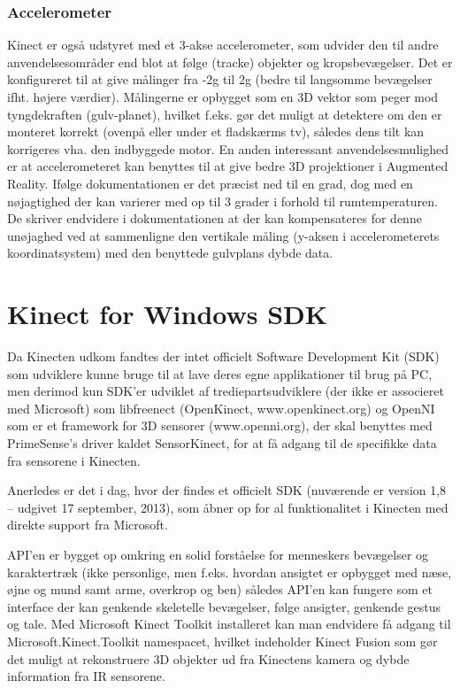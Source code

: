 \subsubsection{Accelerometer}
Kinect er også udstyret med et 3-akse accelerometer, som udvider den til andre anvendelsesområder end blot at følge (tracke) objekter og kropsbevægelser.
Det er konfigureret til at give målinger fra -2g til 2g (bedre til langsomme bevægelser ifht. højere værdier)\cite{kinectAccelerometer}.
Målingerne  er opbygget som en 3D vektor som peger mod tyngdekraften (gulv-planet), hvilket f.eks. gør det muligt at detektere om den er monteret korrekt (ovenpå eller under et fladskærms tv), således dens tilt kan korrigeres vha. den indbyggede motor.
En anden interessant anvendelsesmulighed er at accelerometeret kan benyttes til at give bedre 3D projektioner i Augmented Reality.
Ifølge dokumentationen\cite{kinectDocAccelerometer} er det præcist ned til en grad, dog med en nøjagtighed der kan varierer med op til 3 grader i forhold til rumtemperaturen.
De skriver endvidere i dokumentationen at der kan kompensateres for denne unøjaghed ved at sammenligne den vertikale måling (y-aksen i accelerometerets koordinatsystem) med den benyttede gulvplans dybde data.


\section{Kinect for Windows SDK}
Da Kinecten udkom fandtes der intet officielt Software Development Kit (SDK) som udviklere kunne bruge til at lave deres egne applikationer til brug på PC, men derimod kun SDK'er udviklet af trediepartsudviklere (der ikke er associeret med Microsoft) som libfreenect (OpenKinect, www.openkinect.org) og OpenNI som er et framework for 3D sensorer (www.openni.org), der skal benyttes med PrimeSense's driver kaldet SensorKinect, for at få adgang til de specifikke data fra sensorene i Kinecten.


Anerledes er det i dag, hvor der findes et officielt SDK (nuværende er version 1,8 – udgivet 17 september, 2013\cite{kinectSDK18}), som åbner op for al funktionalitet i Kinecten med direkte support fra Microsoft.

API'en er bygget op omkring en solid forståelse for menneskers bevægelser og karaktertræk (ikke personlige, men f.eks. hvordan ansigtet er opbygget med næse, øjne og mund samt arme, overkrop og ben) således API'en kan fungere som et interface der kan genkende skeletelle bevægelser, følge ansigter, genkende gestus og tale.
Med Microsoft Kinect Toolkit installeret kan man endvidere få adgang til Microsoft.Kinect.Toolkit namespacet, hvilket indeholder Kinect Fusion som gør det muligt at rekonstruere 3D objekter ud fra Kinectens kamera og dybde information fra IR sensorene.\cite{kinectForWindowsFeatures}


